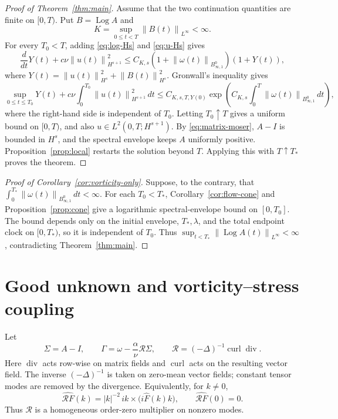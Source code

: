 \documentclass[11pt]{article}
\numberwithin{equation}{section}
\newcommand{\Id}{I}
\newcommand{\divv}{\operatorname{div}}
\newcommand{\curl}{\operatorname{curl}}
\newcommand{\Log}{\operatorname{Log}}
\newcommand{\Besov}{B^0_{\infty,1}}
\newcommand{\calR}{\mathcal R}
\newcommand{\norm}[1]{\left\lVert #1\right\rVert}
\begin{document}
\begin{proof}[Proof of Theorem~\ref{thm:main}]
Assume that the two continuation quantities are finite on \([0,T)\).  Put
\(B=\Log A\) and
\[
  K=\sup_{0\le t<T}\norm{B(t)}_{L^\infty}<\infty .
\]
For every \(T_0<T\), adding \eqref{eq:log-Hs} and \eqref{eq:u-Hs} gives
\[
  \frac{d}{dt}Y(t)+c\nu\norm{u(t)}_{H^{s+1}}^2
  \le
  C_{K,s}(1+\norm{\omega(t)}_{\Besov})(1+Y(t)),
\]
where \(Y(t)=\norm{u(t)}_{H^s}^2+\norm{B(t)}_{H^s}^2\).  Gronwall's inequality
gives
\[
  \sup_{0\le t\le T_0}Y(t)
  +
  c\nu\int_0^{T_0}\norm{u(t)}_{H^{s+1}}^2\,dt
  \le
  C_{K,s,T,Y(0)}
  \exp\left(
    C_{K,s}\int_0^T\norm{\omega(t)}_{\Besov}\,dt
  \right),
\]
where the right-hand side is independent of \(T_0\).  Letting
\(T_0\uparrow T\) gives a uniform bound on \([0,T)\), and also
\(u\in L^2(0,T;H^{s+1})\).  By
\eqref{eq:matrix-moser},
\(A-\Id\) is bounded in \(H^s\), and the spectral envelope keeps \(A\)
uniformly positive.  Proposition~\ref{prop:local} restarts the solution beyond
\(T\).  Applying this with \(T\uparrow T_*\) proves the theorem.
\end{proof}

\begin{proof}[Proof of Corollary~\ref{cor:vorticity-only}]
Suppose, to the contrary, that
\(\int_0^{T_*}\norm{\omega(t)}_{\Besov}\,dt<\infty\).  For each
\(T_0<T_*\), Corollary~\ref{cor:flow-cone} and Proposition~\ref{prop:cone}
give a logarithmic spectral-envelope bound on \([0,T_0]\).  The bound depends
only on the initial envelope, \(T_*,\lambda\), and the total endpoint clock on
\([0,T_*)\), so it is independent of \(T_0\).  Thus
\(\sup_{t<T_*}\norm{\Log A(t)}_{L^\infty}<\infty\), contradicting
Theorem~\ref{thm:main}.
\end{proof}

\section{Good unknown and vorticity--stress coupling}

Let
\[
  \Sigma=A-\Id,\qquad
  \Gamma=\omega-\frac{\alpha}{\nu}\calR\Sigma,\qquad
  \calR=(-\Delta)^{-1}\curl\divv .
\]
Here \(\divv\) acts row-wise on matrix fields and \(\curl\) acts on the
resulting vector field.  The inverse \((-\Delta)^{-1}\) is taken on zero-mean
vector fields; constant tensor modes are removed by the divergence.
Equivalently, for \(k\ne0\),
\[
  \widehat{\calR F}(k)
  =
  |k|^{-2}\,ik\times\bigl(i\widehat F(k)k\bigr),
  \qquad
  \widehat{\calR F}(0)=0 .
\]
Thus \(\calR\) is a homogeneous order-zero multiplier on nonzero modes.
\end{document}
